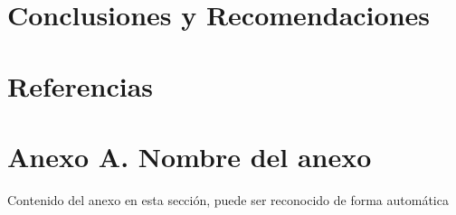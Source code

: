 \documentclass[12pt]{article}
\newcommand{\chapterbreak}{\clearpage \thispagestyle{fancy}}
\begin{document}
\section{Conclusiones y Recomendaciones}


\chapterbreak
\def\refname{}
\section*{Referencias}
\printbibliography[heading=bibintoc]

\chapterbreak
\appendix
\section*{Anexo A. Nombre del anexo}
Contenido del anexo en esta sección, puede ser reconocido de forma automática
\end{document}
